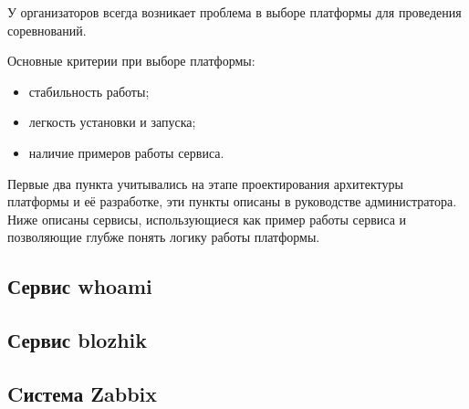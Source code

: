 У организаторов всегда возникает проблема в выборе платформы для проведения соревнований.

Основные критерии при выборе платформы:
\begin{itemize}
\item стабильность работы;
\item легкость установки и запуска;
\item наличие примеров работы сервиса.
\end{itemize}

Первые два пункта учитывались на этапе проектирования архитектуры платформы и её разработке, эти пункты описаны в руководстве администратора.
Ниже описаны сервисы, использующиеся как пример работы сервиса и позволяющие глубже понять логику работы платформы.

\subsection{Сервис whoami}


\subsection{Сервис blozhik}


\subsection{Cистема Zabbix}
